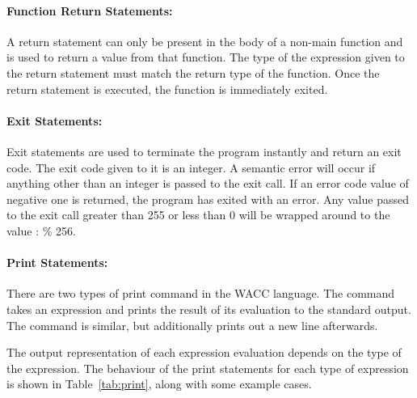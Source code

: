 \documentclass[a4paper]{article}
\theoremstyle{definition}
\begin{document}
\paragraph{Function Return Statements:}
A return statement can only be present in the body of a non-main function and is used to return a value from that function. 
The type of the expression given to the return statement must match the return type of the function. 
Once the return statement is executed, the function is immediately exited.

\paragraph{Exit Statements:}
Exit statements are used to terminate the program instantly and return an exit code. The exit code given to it is an integer.
A semantic error will occur if anything other than an integer is passed to the exit call. If an error code value of negative one is returned,
the program has exited with an error. Any value  passed to the exit call greater than 255 or less than 0 will be wrapped around to the value :
 \% 256.

\paragraph{Print Statements:}
There are two types of print command in the WACC language.
The  command takes an expression and prints the result of its evaluation to the standard output.
The  command is similar, but additionally prints out a new line afterwards.

The output representation of each expression evaluation depends on the type of the expression.
The behaviour of the print statements for each type of expression is shown in Table~\ref{tab:print}, along with some example cases.
\end{document}
